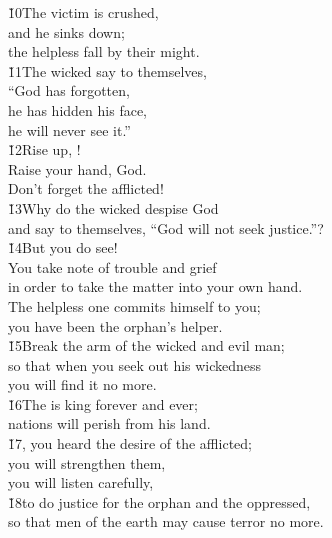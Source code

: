 \begin{poetry}
\poeml \v{10}The victim is crushed, \\
\poemll    and he sinks down; \\
\poemlll       the helpless fall by their might. \\
\poeml \v{11}The wicked say to themselves, \\
\poemll    ``God has forgotten, \\
\poeml he has hidden his face, \\
\poemll    he will never see it.'' \\
\poeml \v{12}Rise up, ! \\
\poemll    Raise your hand, God. \\
\poemlll       Don't forget the afflicted! \\
\poeml \v{13}Why do the wicked despise God \\
\poemll    and say to themselves, ``God will not seek justice.''? \\
\poeml \v{14}But you do see! \\
\poemll    You take note of trouble and grief \\
\poemlll       in order to take the matter into your own hand. \\
\poeml The helpless one commits himself to you; \\
\poemll    you have been the orphan's helper. \\
\poeml \v{15}Break the arm of the wicked and evil man; \\
\poemll    so that when you seek out his wickedness \\
\poemlll       you will find it no more. \\
\poeml \v{16}The  is king forever and ever; \\
\poemll    nations will perish from his land. \\
\poeml \v{17}, you heard the desire of the afflicted; \\
\poemll    you will strengthen them, \\
\poemlll       you will listen carefully, \\
\poeml \v{18}to do justice for the orphan and the oppressed, \\
\poemll    so that men of the earth may cause terror no more.
\end{poetry}


